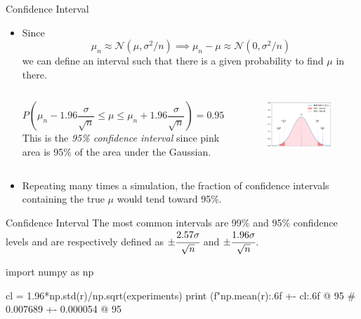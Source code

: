 \documentclass{beamer}
\begin{document}
\begin{frame}{Confidence Interval}
\begin{itemize}
\item Since
\begin{equation*}
\mu_n \approx \mathcal{N}(\mu, \sigma^2/n)\implies \mu_n - \mu \approx \mathcal{N}(0, \sigma^2/n)
\end{equation*}
we can define an interval such that there is a given probability to find $\mu$ in there.
\begin{columns}
\begin{equation*}
P\left(\mu_n - 1.96\frac{\sigma}{\sqrt{n}}\le \mu \le \mu_n + 1.96\frac{\sigma}{\sqrt{n}}\right) = 0.95
\end{equation*}
This is the \emph{95\% confidence interval} since pink area is 95\% of the area under the Gaussian.
\begin{figure}[h]
    \begin{center}
    \includegraphics[width=0.8\linewidth]{confidence_interval_pink}
    \end{center}
\end{figure}    
\end{columns}
\item Repeating many times a simulation, the fraction of confidence intervals containing the true $\mu$ would tend toward 95\%.
\end{itemize}
\end{frame}

\begin{frame}[fragile]{Confidence Interval}
  The most common intervals are 99\% and 95\% confidence levels and are respectively defined as $\pm \cfrac{2.57\sigma}{\sqrt{n}}$ and $\pm \cfrac{1.96\sigma}{\sqrt{n}}$.
 \vspace{1.0 cm} 
\begin{ipython}
import numpy as np

cl = 1.96*np.std(r)/np.sqrt(experiments)
print (f"{np.mean(r):.6f} +- {cl:.6f} @ 95%
# 0.007689 +- 0.000054 @ 95%
\end{ipython}
\end{frame}
\end{document}
